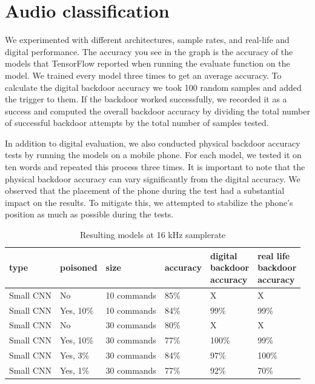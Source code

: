 \documentclass{report}
\theoremstyle{definition}
\theoremstyle{remark}
\begin{document}
\section{Audio classification}
We experimented with different architectures, sample rates, and real-life and digital performance. The accuracy you see in the graph is the accuracy of the models that TensorFlow reported when running the evaluate function on the model. We trained every model three times to get an average accuracy. To calculate the digital backdoor accuracy we took 100 random samples and added the trigger to them. If the backdoor worked successfully, we recorded it as a success and computed the overall backdoor accuracy by dividing the total number of successful backdoor attempts by the total number of samples tested.

In addition to digital evaluation, we also conducted physical backdoor accuracy tests by running the models on a mobile phone. For each model, we tested it on ten words and repeated this process three times. It is important to note that the physical backdoor accuracy can vary significantly from the digital accuracy. We observed that the placement of the phone during the test had a substantial impact on the results. To mitigate this, we attempted to stabilize the phone's position as much as possible during the tests.

\begin{table}[!hbt]
\centering
\begin{tabular}{|l|l|l|l|l|l|}
\hline
type & poisoned & size & accuracy &  \thead{digital \\ backdoor \\ accuracy} & \thead{real life \\ backdoor \\ accuracy} \\ \hline
Small CNN & No  &  10 commands  &  85\% & X & X \\ \hline
Small CNN & Yes, 10\%  &  10 commands  & 84\% & 99\% & 99\% \\ \hline
Small CNN & No  &  30 commands  &   80\%  & X   & X \\ \hline
Small CNN & Yes, 10\%  &  30 commands  &  77\% & 100\% & 99\%     \\ \hline
Small CNN & Yes, 3\%  &  30 commands  &  84\%  & 97\%  & 100\%  \\ \hline
Small CNN & Yes, 1\%  &  30 commands  &  77\%  & 92\%  & 70\%  \\ \hline
\end{tabular}
\caption{Resulting models at 16 kHz samplerate}
\label{tab:small_CNN_16K}
\end{table}
\end{document}
